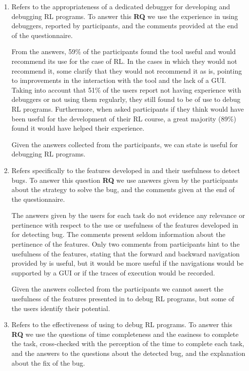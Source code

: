 \begin{enumerate}[label=\textbf{RQ.\arabic*}]
  \item Refers to the appropriateness of a dedicated debugger for developing and debugging \ac{RL} 
  programs. To answer this \textbf{RQ} we use the experience in using debuggers, reported by 
  participants, and the comments provided at the end of the questionnaire. 
  
  From the answers, 59\% of the participants found the tool useful and would recommend its use for 
  the case of \ac{RL}. 
  In the cases in which they would not recommend it, some clarify that they would not recommend it 
  as is, pointing to improvements in the interaction with the tool and the lack of a GUI. Taking into 
  account that 51\% of the users report not having experience with debuggers or not using them 
  regularly, they still found \flik to be of use to debug \ac{RL} programs. Furthermore, when asked 
  participants if they think \flik would have been useful for the development of their \ac{RL} course, a 
  great majority (89\%) found it would have helped their experience. 
  
  Given the answers collected from the participants, we can state \flik is useful for debugging \ac{RL} 
  programs. 
  
  \item Refers specifically to the features developed in \flik and their usefulness to detect bugs. To 
  answer this question \textbf{RQ} we use answers given by the participants about the strategy to 
  solve the bug, and the comments given at the end of the questionnaire.
  
  The answers given by the users for each task do not evidence any relevance or pertinence with 
  respect to the use or usefulness of the features developed in \flik for detecting bug. The comments 
  present seldom information about the pertinence of the features. Only two comments from 
  participants hint to the usefulness of the features, stating that the forward and backward navigation 
  provided by \flik is useful, but it would be more useful if the navigations would be supported by a GUI 
  or if the traces of execution would be recorded.
  
  Given the answers collected from the participants we cannot assert the usefulness of the features 
  presented in \flik to debug \ac{RL} programs, but some of the users identify their potential.
  
  \item Refers to the effectiveness of using \flik to debug \ac{RL} programs. To answer this \textbf{RQ} 
  we use the questions of time completeness and the easiness to complete the task, cross-checked 
  with the perception of the time to complete each task, and the answers to the questions about the 
  detected bug, and the explanation about the fix of the bug.
  

\end{enumerate}
